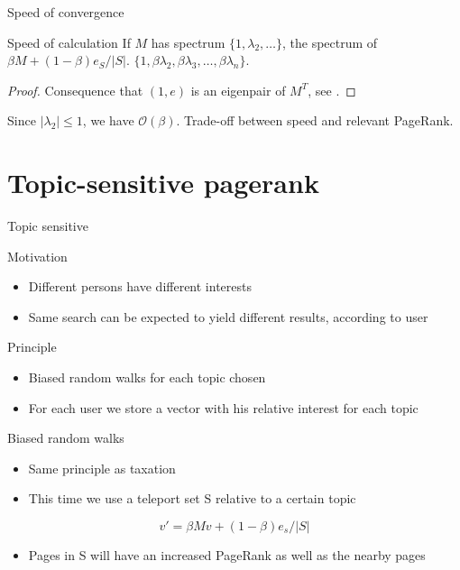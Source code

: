 \documentclass[10pt]{beamer}
\newcommand\bigoh{\mathcal{O}}
\begin{document}
\begin{frame}{Speed of convergence}
  \begin{block}{Speed of calculation \cite[p.~12]{langville2004deeper}}
    If $M$ has spectrum $\{1,\lambda_2,\ldots\}$,
    the spectrum of $\beta M + (1-\beta)e_S/|S|$.
    $\{1,\beta\lambda_2,\beta\lambda_3,\ldots,\beta\lambda_n\}$.
    \begin{proof}
      Consequence that $(1,e)$ is an eigenpair of $M^T$,
      see \cite[p.~12]{langville2004deeper}.
    \end{proof}
  \end{block}
  Since $|\lambda_2| \leq 1$, we have $\bigoh(\beta)$.
  Trade-off between speed and relevant PageRank.
\end{frame}
\section{Topic-sensitive pagerank}
\begin{frame}
  \tableofcontents[currentsection]
\end{frame}
\begin{frame}[allowframebreaks]{Topic sensitive}
  \begin{block}{Motivation}
  \begin{itemize}
  \item Different persons have different interests
  \item Same search can be expected to yield different results, according to user
  \end{itemize}
  \end{block}
  \begin{block}{Principle}
  \begin{itemize}
  \item Biased random walks for each topic chosen
  \item For each user we store a vector with his relative interest for each topic
  \end{itemize}
  \end{block}
  \framebreak
  \begin{block}{Biased random walks}
    \begin{itemize}
      \item Same principle as taxation
      \item This time we use a teleport set S relative to a certain topic
    \end{itemize}
    $$ v' = \beta Mv + (1-\beta)e_s/|S|$$
    \begin{itemize}
    \item Pages in S will have an increased PageRank as well as the nearby pages
    \end{itemize}
  \end{block}
\end{frame}
\end{document}
